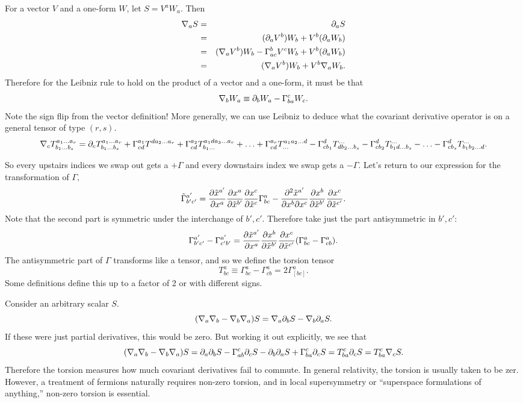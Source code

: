 For a vector $V$ and a one-form $W$, let $S=V^a W_a$. Then
\begin{eqnarray*}
\nabla_a S&=& \partial_a S\\
&=& (\partial_a V^b)W_b+ V^b(\partial_a W_b)\\
&=& (\nabla_a V^b)W_b- \Gamma^b_{ac} V^c W_b+V^b(\partial_a W_b)\\
&=& (\nabla_a V^b)W_b+ V^b \nabla_a W_b.
\end{eqnarray*}
Therefore for the Leibniz rule to hold on the product of a vector and a one-form, it must be that
$$\nabla_b W_a \equiv \partial_b W_a - \Gamma^c_{ba}W_c.$$
Note the sign flip from the vector definition! More generally, we can use Leibniz to deduce what the covariant derivative operator is on a general tensor of type $(r,s)$.
$$\nabla_c T^{a_1\ldots a_r}_{b_1\ldots b_s} = \partial_c T^{a_1\ldots a_r}_{b_1\ldots b_s}+ 
\Gamma^{a_1}_{cd} T^{da_2 \ldots a_r}+\Gamma^{a_2}_{cd} T^{a_1 d a_3 \ldots a_r}_{b_1\ldots}+\ldots + \Gamma^{a_r}_{cd}T^{a_1a_2\ldots d}_{\ldots} - \Gamma^d_{cb_1}T^{\ldots}_{db_2 \ldots b_s}- \Gamma^d_{cb_2} T^{\ldots}_{b_1 d \ldots b_s}-\ldots - \Gamma^d_{cb_s} T^{\ldots}_{b_1 b_2 \ldots d}.$$

So every upstairs indices we swap out gets a $+\Gamma$ and every downstairs index we swap gets a $-\Gamma$. Let's return to our expression for the transformation of $\Gamma,$
$$\tilde \Gamma^{a'}_{b'c'}=\frac{\partial \tilde x^{a'}}{\partial x^a} \frac{ \partial x^a}{\partial \tilde x^{b'}}\frac{\partial x^c}{\partial \tilde x^c} \Gamma^a_{bc}-\frac{\partial^2 \tilde x^{a'}}{\partial x^b \partial x^c}\frac{\partial x^b}{\partial \tilde x^{b'}}\frac{\partial x^c}{\partial\tilde x^{c'}}.$$
Note that the second part is symmetric under the interchange of $b',c'$. Therefore take just the part antisymmetric in $b',c'$:
$$\Gamma^{a'}_{b'c'}-\Gamma^{a'}_{c'b'}=\frac{\partial \tilde x^{a'}}{\partial x^a}\frac{\partial x^b}{\partial \tilde x^{b'}}\frac{\partial x^c}{\partial \tilde x^{c'}}(\Gamma^a_{bc}-\Gamma^a_{cb}).$$
The antisymmetric part of $\Gamma$ transforms like a tensor, and so we define the torsion tensor
$$T^a_{bc}\equiv\Gamma^a_{bc}-\Gamma^a_{cb}=2\Gamma^a_{[bc]}.$$
Some definitions define this up to a factor of 2 or with different signs.

Consider an arbitrary scalar $S$.
$$(\nabla_a \nabla_b-\nabla_b\nabla_a)S= \nabla_a \partial_b S- \nabla_b \partial_a S.$$
If these were just partial derivatives, this would be zero. But working it out explicitly, we see that 
$$(\nabla_a \nabla_b-\nabla_b\nabla_a)S=\partial_a \partial_b S-\Gamma^c_{ab}\partial_c S -\partial_b \partial_a S + \Gamma^c_{ba}\partial_c S = T^c_{ba} \partial_c S = T^c_{ba}\nabla_c S.$$
Therefore the torsion measures how much covariant derivatives fail to commute. In general relativity, the torsion is usually taken to be zer. However, a treatment of fermions naturally requires non-zero torsion, and in local supersymmetry or ``superspace formulations of anything,'' non-zero torsion is essential.

